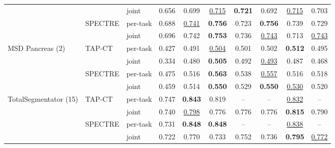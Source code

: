 \begin{tabular}{@{}lllccccccc@{}}
 &  & joint & 0.656 & 0.699 & \underline{0.715} & \cellcolor{modebest}\textbf{0.721} & 0.692 & \cellcolor{modebest}\underline{0.715} & 0.703 \\
\addlinespace[1.5pt]
 & SPECTRE & per-task & 0.688 & \underline{0.741} & \cellcolor{modebest}\textbf{0.756} & 0.723 & \cellcolor{modebest}\textbf{0.756} & \cellcolor{modebest}0.739 & 0.729 \\
 &  & joint & \cellcolor{modebest}0.696 & \cellcolor{modebest}0.742 & \textbf{0.753} & \cellcolor{modebest}0.736 & \underline{0.743} & 0.713 & \cellcolor{modebest}\underline{0.743} \\
\addlinespace
MSD Pancreas (2) & TAP-CT & per-task & \cellcolor{modebest}0.427 & \cellcolor{modebest}0.491 & \underline{0.504} & \cellcolor{modebest}0.501 & \cellcolor{modebest}0.502 & \cellcolor{modebest}\textbf{0.512} & \cellcolor{modebest}0.495 \\
 &  & joint & 0.334 & 0.480 & \cellcolor{modebest}\textbf{0.505} & 0.492 & \underline{0.493} & 0.487 & 0.468 \\
\addlinespace[1.5pt]
 & SPECTRE & per-task & \cellcolor{modebest}0.475 & \cellcolor{modebest}0.516 & \cellcolor{modebest}\textbf{0.563} & \cellcolor{modebest}0.538 & \cellcolor{modebest}\underline{0.557} & 0.516 & 0.518 \\
 &  & joint & 0.459 & 0.514 & \textbf{0.550} & 0.529 & \textbf{0.550} & \cellcolor{modebest}\underline{0.530} & \cellcolor{modebest}0.520 \\
\addlinespace
TotalSegmentator (15) & TAP-CT & per-task & \cellcolor{modebest}0.747 & \cellcolor{modebest}\textbf{0.843} & \cellcolor{modebest}0.819 & -- & -- & \cellcolor{modebest}\underline{0.832} & -- \\
 &  & joint & 0.740 & \underline{0.798} & 0.776 & 0.776 & 0.776 & \textbf{0.815} & 0.790 \\
\addlinespace[1.5pt]
 & SPECTRE & per-task & \cellcolor{modebest}0.731 & \cellcolor{modebest}\textbf{0.848} & \cellcolor{modebest}\textbf{0.848} & -- & -- & \cellcolor{modebest}\underline{0.838} & -- \\
 &  & joint & 0.722 & 0.770 & 0.733 & 0.752 & 0.736 & \textbf{0.795} & \underline{0.772} \\
\bottomrule
\end{tabular}
